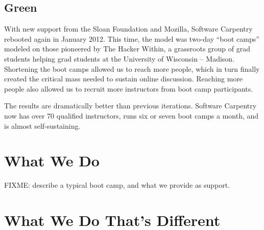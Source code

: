 \documentclass{article}
\begin{document}
\subsection*{Green}

With new support from the Sloan Foundation and Mozilla,
Software Carpentry rebooted again in January 2012.
This time,
the model was two-day ``boot camps''
modeled on those pioneered by The Hacker Within,
a grassroots group of grad students helping grad students
at the University of Wisconsin -- Madison.
Shortening the boot camps allowed us to reach more people,
which in turn finally created
the critical mass needed to sustain online discussion.
Reaching more people also allowed us to recruit more instructors
from boot camp participants.

The results are dramatically better than previous iterations.
Software Carpentry now has over 70 qualified instructors,
runs six or seven boot camps a month,
and is almost self-sustaining.

\section{What We Do}

FIXME: describe a typical boot camp, and what we provide as support.

\section{What We Do That's Different}
\end{document}
